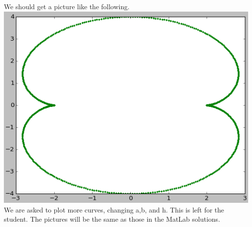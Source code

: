 \documentclass[11pt]{article}   %
\begin{document}
We should get a picture like the following.
\\
\includegraphics[scale=0.75]{Hw1Fig3.png}
\\
We are asked to plot more curves, changing a,b, and h.  This is left for the student.  The pictures will be the same as those in the MatLab solutions.
\end{document}
